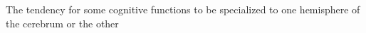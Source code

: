 The tendency for some cognitive functions to be specialized to one hemisphere of the cerebrum or the other

